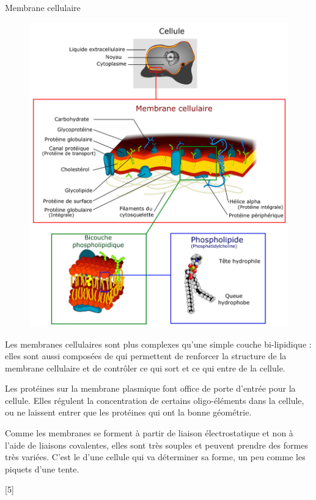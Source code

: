 \begin{doc}{Membrane cellulaire}
  \begin{figure}
    \centering
    \vspace*{-36pt}
    \includegraphics[width=1\linewidth]{images/exterieures/biologie/cellule_membrane_lipide}
  \end{figure}
  Les membranes cellulaires sont plus complexes qu'une simple couche bi-lipidique : elles sont aussi composées de  qui permettent de renforcer la structure de la membrane cellulaire et de contrôler ce qui sort et ce qui entre de la cellule.
  \smallskip

  Les protéines sur la membrane plasmique font office de porte d'entrée pour la cellule. 
  Elles régulent la concentration de certains oligo-éléments dans la cellule, ou ne laissent entrer que les protéines qui ont la bonne géométrie.

  Comme les membranes se forment à partir de liaison électrostatique et non à l'aide de liaisons covalentes, elles sont très souples et peuvent prendre des formes très variées. 
  C'est le  d'une cellule qui va déterminer sa forme, un peu comme les piquets d'une tente.
  
  \phantom{b}
\end{doc}

[5]
